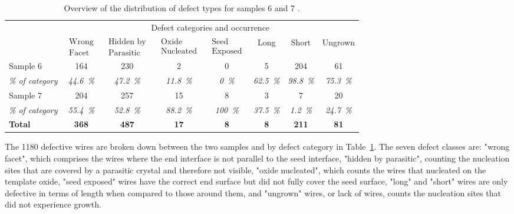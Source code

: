 \begin{table}
    \centering
    \caption[Overview of the distribution of defect types for samples 6 and 7.]{Overview of the distribution of defect types for samples 6 and 7 \cite{Brugnolotto2023_2}.}
    \begin{tabular}{l|ccccccc}
        \hline
         & \multicolumn{7}{c}{Defect categories and occurrence} \\ 
         & $\begin{matrix} \text{Wrong} \\ \text{Facet} \end{matrix}$ & $\begin{matrix} \text{Hidden by} \\ \text{Parasitic} \end{matrix}$ & $\begin{matrix} \text{Oxide} \\ \text{Nucleated} \end{matrix}$ & $\begin{matrix} \text{Seed} \\ \text{Exposed} \end{matrix}$ & Long & Short & Ungrown \\ 
        \hline \hline
        Sample 6 & \num{164} & \num{230} & \num{2} & \num{0} & \num{5} & \num{204} & \num{61} \\ 
        \textit{\% of category} & \textit{\qty{44.6}{\%}} & \textit{\qty{47.2}{\%}} & \textit{\qty{11.8}{\%}} & \textit{\qty{0}{\percent}} & \textit{\qty{62.5}{\%}} & \textit{\qty{98.8}{\%}} & \textit{\qty{75.3}{\%}} \\ 
        \hline
        Sample 7 & \num{204} & \num{257} & \num{15} & \num{8} & \num{3} & \num{7} & \num{20} \\ 
        \textit{\% of category} & \textit{\qty{55.4}{\%}} & \textit{\qty{52.8}{\%}} & \textit{\qty{88.2}{\%}} & \textit{\qty{100}{\%}} & \textit{\qty{37.5}{\%}} & \textit{\qty{1.2}{\%}} & \textit{\qty{24,7}{\%}} \\ 
        \hline
        \textbf{Total} & \textbf{\num{368}} & \textbf{\num{487}} & \textbf{\num{17}} & \textbf{\num{8}} & \textbf{\num{8}} & \textbf{\num{211}} & \textbf{\num{81}} \\
        \hline
    \end{tabular}
    \label{tab:defects_overview}
\end{table}

The \num{1180} defective wires are broken down between the two samples and by defect category in Table~\ref{tab:defects_overview}. The seven defect classes are: "wrong facet", which comprises the wires where the end interface is not parallel to the  seed interface, "hidden by parasitic", counting the nucleation sites that are covered by a parasitic crystal and therefore not visible, "oxide nucleated", which counts the wires that nucleated on the template oxide, "seed exposed" wires have the correct end surface but did not fully cover the seed surface, "long" and "short" wires are only defective in terms of length when compared to those around them, and "ungrown" wires, or lack of wires, counts the nucleation sites that did not experience growth.

